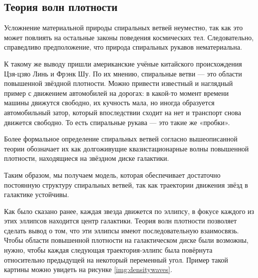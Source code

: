 \subsection{Теория волн плотности}
Усложнение материальной природы спиральных ветвей неуместно, так как это может повлиять на остальные законы поведения космических тел. Следовательно, справедливо предположение, что природа спиральных рукавов нематериальна.

К такому же выводу пришли американские учёные китайского происхождения Цзя-цзяо Линь и Фрэнк Шу. По их мнению, спиральные ветви — это области повышенной звёздной плотности. Можно привести известный и наглядный пример с движением автомобилей на дорогах: в какой-то момент времени машины движутся свободно, их кучность мала, но иногда образуется автомобильный затор, который впоследствии сходит на нет и транспорт снова движется свободно. То есть спиральные рукава — это такие же «пробки».

Более формальное определение спиральных ветвей согласно вышеописанной теории обозначает их как долгоживущие квазистационарные волны повышенной плотности, находящиеся на звёздном диске галактики.

Таким образом, мы получаем модель, которая обеспечивает достаточно постоянную структуру спиральных ветвей, так как траектории движения звёзд в галактике устойчивы.

Как было сказано ранее, каждая звезда движется по эллипсу, в фокусе каждого из этих эллипсов находится центр галактики. Теория волн плотности позволяет сделать вывод о том, что эти эллипсы имеют последовательную взаимосвязь. Чтобы области повышенной плотности на галактическом диске были возможны, нужно, чтобы каждая следующая траектория-эллипс была повёрнута относительно предыдущей на некоторый переменный угол. Пример такой картины можно увидеть на рисунке \ref{img:densitywaves}.

